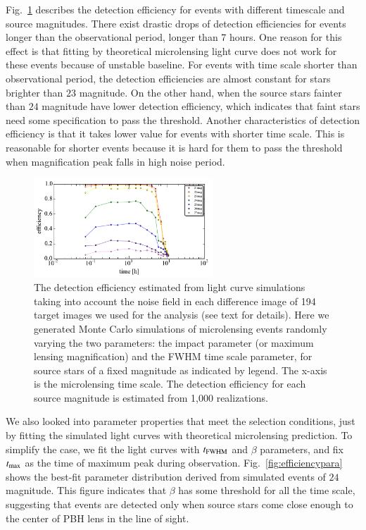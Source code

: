 \documentclass[iop, apj]{emulateapj}
\newcommand{\?}{\stackrel{?}{=}}
\begin{document}
\begin{itemize}
\begin{itemize}
	Fig.~\ref{fig:efficiencyeach} describes the detection efficiency for events with different 
	timescale and source magnitudes. 
	There exist drastic drops of detection efficiencies for events longer than the observational period, longer than 7 hours. 
	One reason for this effect is that fitting by theoretical microlensing light curve does not work for these events because of unstable baseline. 
	For events with time scale shorter than observational period, 
	the detection efficiencies are almost constant for stars brighter than $23$ magnitude. 
	On the other hand, when the source stars fainter than $24$ magnitude have lower detection efficiency, which indicates that 
	faint stars need some specification to pass the threshold. 
	Another characteristics of detection efficiency is that it takes lower value for events with shorter time scale. 
	This is reasonable for shorter events because 
	it is hard for them to pass the threshold when magnification peak falls in high noise period.  
%
\begin{figure}
\centering
\includegraphics[width=0.6\textwidth]{pic/efficiency_eachmag.pdf}
\caption{\small{ The detection efficiency estimated from light curve simulations taking into account the noise field in each difference image of 194 target images we used for the analysis (see text for details). Here we generated Monte Carlo simulations of microlensing events randomly varying the two parameters: the impact parameter (or maximum lensing magnification) and the FWHM time scale parameter, for source stars of a fixed magnitude as indicated by legend. The x-axis is the microlensing time scale. The detection efficiency for each source magnitude is estimated from 1,000 realizations.}}
\label{fig:efficiencyeach}
\end{figure}
%
	We also looked into parameter properties that meet the selection conditions, just by fitting the simulated light curves with theoretical microlensing prediction. To simplify the case, we fit the light curves with $t_{\rm FWHM}$ and $\beta$ parameters, and fix $t_{\rm max}$ as the time of maximum peak during observation.   
	Fig.~\ref{fig:efficiencypara} shows the best-fit parameter distribution derived from simulated events of $24$ magnitude. This figure indicates that $\beta$ has some threshold for all the time scale, suggesting that events are detected only when source stars come close enough to the center of PBH lens in the line of sight.  

\end{itemize}
\end{itemize}
\end{document}
